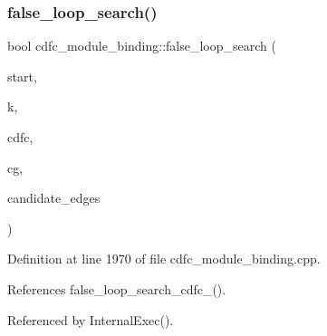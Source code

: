\subsubsection{\texorpdfstring{false\+\_\+loop\+\_\+search()}{false\_loop\_search()}}
{\footnotesize\ttfamily bool cdfc\+\_\+module\+\_\+binding\+::false\+\_\+loop\+\_\+search (\begin{DoxyParamCaption}\item[{\hyperlink{cdfc__module__binding_8hpp_affa85aa857f7ad00e0ed52c20fcd863b}{cdfc\+\_\+vertex}}]{start,  }\item[{unsigned}]{k,  }\item[{const \hyperlink{cdfc__module__binding_8hpp_a3f94e2158e9a11882a35140b0365f1ad}{cdfc\+\_\+graph\+Const\+Ref} \&}]{cdfc,  }\item[{const \hyperlink{cdfc__module__binding_8hpp_a3f94e2158e9a11882a35140b0365f1ad}{cdfc\+\_\+graph\+Const\+Ref} \&}]{cg,  }\item[{std\+::deque$<$ \hyperlink{cdfc__module__binding_8hpp_a5ef126c5daeb3e4b387d23088ebce43e}{cdfc\+\_\+edge} $>$ \&}]{candidate\+\_\+edges }\end{DoxyParamCaption})\hspace{0.3cm}{\ttfamily [protected]}}



Definition at line 1970 of file cdfc\+\_\+module\+\_\+binding.\+cpp.



References false\+\_\+loop\+\_\+search\+\_\+cdfc\+\_().



Referenced by Internal\+Exec().

